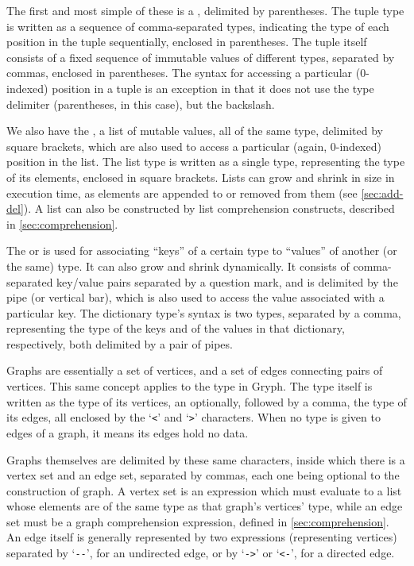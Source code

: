 The first and most simple of these is a , delimited by parentheses. The tuple type is written as a sequence of comma-separated types, indicating the type of each position in the tuple sequentially, enclosed in parentheses. The tuple itself consists of a fixed sequence of immutable values of different types, separated by commas, enclosed in parentheses. The syntax for accessing a particular (0-indexed) position in a tuple is an exception in that it does not use the type delimiter (parentheses, in this case), but the backslash.

We also have the , a list of mutable values, all of the same type, delimited by square brackets, which are also used to access a particular (again, 0-indexed) position in the list. The list type is written as a single type, representing the type of its elements, enclosed in square brackets. Lists can grow and shrink in size in execution time, as elements are appended to or removed from them (see \ref{sec:add-del}). A list can also be constructed by list comprehension constructs, described in \ref{sec:comprehension}.

The  or  is used for associating ``keys'' of a certain type to ``values'' of another (or the same) type. It can also grow and shrink dynamically. It consists of comma-separated key/value pairs separated by a question mark, and is delimited by the pipe (or vertical bar), which is also used to access the value associated with a particular key. The dictionary type's syntax is two types, separated by a comma, representing the type of the keys and of the values in that dictionary, respectively, both delimited by a pair of pipes.

Graphs are essentially a set of vertices, and a set of edges connecting pairs of vertices. This same concept applies to the  type in Gryph. The  type itself is written as the type of its vertices, an optionally, followed by a comma, the type of its edges, all enclosed by the `\texttt{<}' and `\texttt{>}' characters. When no type is given to edges of a graph, it means its edges hold no data.

Graphs themselves are delimited by these same characters, inside which there is a vertex set and an edge set, separated by commas, each one being optional to the construction of graph. A vertex set is an expression which must evaluate to a list whose elements are of the same type as that graph's vertices' type, while an edge set must be a graph comprehension expression, defined in \ref{sec:comprehension}. An edge itself is generally represented by two expressions (representing vertices) separated by `\texttt{-{}-}', for an undirected edge, or by `\texttt{->}' or `\texttt{<-}', for a directed edge.


